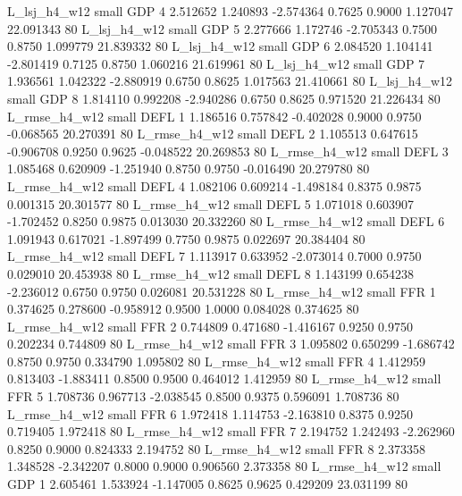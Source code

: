   L_lsj_h4_w12      small      GDP                 4 2.512652 1.240893 -2.574364 0.7625 0.9000  1.127047   22.091343 80
  L_lsj_h4_w12      small      GDP                 5 2.277666 1.172746 -2.705343 0.7500 0.8750  1.099779   21.839332 80
  L_lsj_h4_w12      small      GDP                 6 2.084520 1.104141 -2.801419 0.7125 0.8750  1.060216   21.619961 80
  L_lsj_h4_w12      small      GDP                 7 1.936561 1.042322 -2.880919 0.6750 0.8625  1.017563   21.410661 80
  L_lsj_h4_w12      small      GDP                 8 1.814110 0.992208 -2.940286 0.6750 0.8625  0.971520   21.226434 80
 L_rmse_h4_w12      small     DEFL                 1 1.186516 0.757842 -0.402028 0.9000 0.9750 -0.068565   20.270391 80
 L_rmse_h4_w12      small     DEFL                 2 1.105513 0.647615 -0.906708 0.9250 0.9625 -0.048522   20.269853 80
 L_rmse_h4_w12      small     DEFL                 3 1.085468 0.620909 -1.251940 0.8750 0.9750 -0.016490   20.279780 80
 L_rmse_h4_w12      small     DEFL                 4 1.082106 0.609214 -1.498184 0.8375 0.9875  0.001315   20.301577 80
 L_rmse_h4_w12      small     DEFL                 5 1.071018 0.603907 -1.702452 0.8250 0.9875  0.013030   20.332260 80
 L_rmse_h4_w12      small     DEFL                 6 1.091943 0.617021 -1.897499 0.7750 0.9875  0.022697   20.384404 80
 L_rmse_h4_w12      small     DEFL                 7 1.113917 0.633952 -2.073014 0.7000 0.9750  0.029010   20.453938 80
 L_rmse_h4_w12      small     DEFL                 8 1.143199 0.654238 -2.236012 0.6750 0.9750  0.026081   20.531228 80
 L_rmse_h4_w12      small      FFR                 1 0.374625 0.278600 -0.958912 0.9500 1.0000  0.084028    0.374625 80
 L_rmse_h4_w12      small      FFR                 2 0.744809 0.471680 -1.416167 0.9250 0.9750  0.202234    0.744809 80
 L_rmse_h4_w12      small      FFR                 3 1.095802 0.650299 -1.686742 0.8750 0.9750  0.334790    1.095802 80
 L_rmse_h4_w12      small      FFR                 4 1.412959 0.813403 -1.883411 0.8500 0.9500  0.464012    1.412959 80
 L_rmse_h4_w12      small      FFR                 5 1.708736 0.967713 -2.038545 0.8500 0.9375  0.596091    1.708736 80
 L_rmse_h4_w12      small      FFR                 6 1.972418 1.114753 -2.163810 0.8375 0.9250  0.719405    1.972418 80
 L_rmse_h4_w12      small      FFR                 7 2.194752 1.242493 -2.262960 0.8250 0.9000  0.824333    2.194752 80
 L_rmse_h4_w12      small      FFR                 8 2.373358 1.348528 -2.342207 0.8000 0.9000  0.906560    2.373358 80
 L_rmse_h4_w12      small      GDP                 1 2.605461 1.533924 -1.147005 0.8625 0.9625  0.429209   23.031199 80
